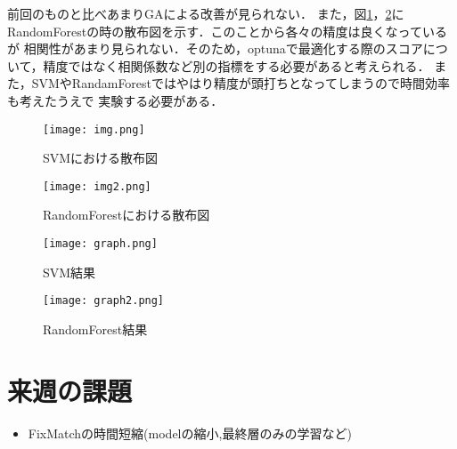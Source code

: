 \documentclass[twocolumn]{jarticle}     %
\begin{document}
前回のものと比べあまりGAによる改善が見られない．
また，図\ref{fig:ex2_1}，\ref{fig:ex2_2}にRandomForestの時の散布図を示す．このことから各々の精度は良くなっているが
相関性があまり見られない．そのため，optunaで最適化する際のスコアについて，精度ではなく相関係数など別の指標をする必要があると考えられる．
また，SVMやRandamForestではやはり精度が頭打ちとなってしまうので時間効率も考えたうえで
実験する必要がある．

\begin{figure}[h]
	\begin{center}
		\centering
		\texttt{[image: img.png]}
		\caption{SVMにおける散布図\label{fig:ex2_1}}
	\end{center}
\end{figure}


\begin{figure}[h]
	\begin{center}
		\centering
		\texttt{[image: img2.png]}
		\caption{RandomForestにおける散布図\label{fig:ex2_2}}
	\end{center}
\end{figure}


\begin{figure}[h]
	\begin{center}
		\vspace*{-7mm}
		\hspace*{-8mm}
		\texttt{[image: graph.png]}
		\caption{SVM結果\label{fig:ex1}}
	\end{center}
\end{figure}

\begin{figure}[h]
	\begin{center}
		\vspace*{-7mm}
		\hspace*{-8mm}
		\texttt{[image: graph2.png]}
		\caption{RandomForest結果\label{fig:ex2}}
	\end{center}
\end{figure}

\section{来週の課題}
	\begin{itemize}
		\item FixMatchの時間短縮(modelの縮小,最終層のみの学習など)
	\end{itemize}
\end{document}
